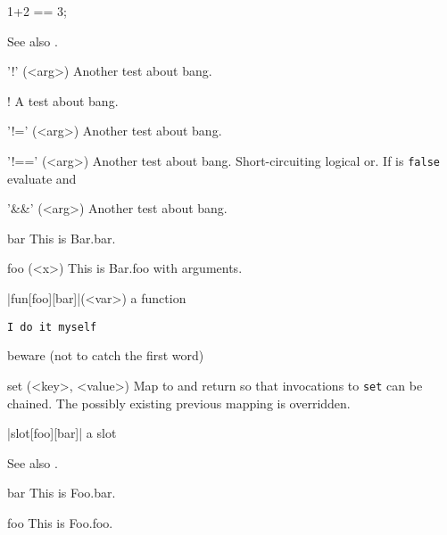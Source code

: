 \documentclass[openright,twoside,11pt]{book}
\begin{document}
\begin{urbiassert}
1+2 == 3;
\end{urbiassert}


See also .

\begin{urbiscriptapi}
\item['!'](<arg>) Another test about bang.


\item[!] A test about bang.


\item['!='](<arg>) Another test about bang.


\item['!=='](<arg>) Another test about bang.
  Short-circuiting logical or. If \this is \lstinline|false| evaluate and


\item['&&'](<arg>) Another test about bang.




\item[bar] This is Bar.bar.


\item[foo](<x>) This is Bar.foo with arguments.


\item|fun[foo][bar]|(<var>) a function


\item \lstinline|I do it myself|
\item beware (not to catch the first word)


\item[set](<key>, <value>) Map  to  and return \this so
  that invocations to \lstinline|set| can be chained.  The possibly existing
  previous mapping is overridden.


\item|slot[foo][bar]| a slot
\end{urbiscriptapi}


See also .

\begin{urbiscriptapi}
\item[bar] This is Foo.bar.


\item[foo] This is Foo.foo.
\end{urbiscriptapi}
\end{document}
